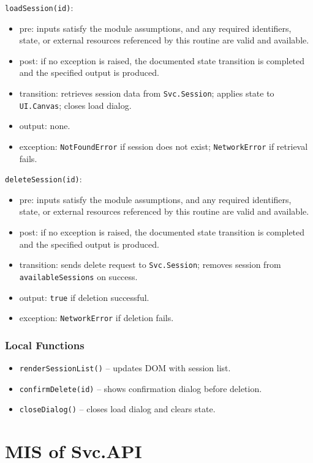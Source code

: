 \documentclass[12pt, titlepage]{article}
\begin{document}
\noindent \texttt{loadSession(id)}:
\begin{itemize}
    \item pre: inputs satisfy the module assumptions, and any required identifiers, state, or external resources referenced by this routine are valid and available.
    \item post: if no exception is raised, the documented state transition is completed and the specified output is produced.
    \item transition: retrieves session data from \texttt{Svc.Session}; applies state to \texttt{UI.Canvas}; closes load dialog.
    \item output: none.
    \item exception: \texttt{NotFoundError} if session does not exist; \texttt{NetworkError} if retrieval fails.
\end{itemize}

\noindent \texttt{deleteSession(id)}:
\begin{itemize}
    \item pre: inputs satisfy the module assumptions, and any required identifiers, state, or external resources referenced by this routine are valid and available.
    \item post: if no exception is raised, the documented state transition is completed and the specified output is produced.
    \item transition: sends delete request to \texttt{Svc.Session}; removes session from \texttt{availableSessions} on success.
    \item output: \texttt{true} if deletion successful.
    \item exception: \texttt{NetworkError} if deletion fails.
\end{itemize}

\subsubsection{Local Functions}
\begin{itemize}
    \item \texttt{renderSessionList()} – updates DOM with session list.
    \item \texttt{confirmDelete(id)} – shows confirmation dialog before deletion.
    \item \texttt{closeDialog()} – closes load dialog and clears state.
\end{itemize}

\section{MIS of Svc.API} \label{Svc.API}
\end{document}
